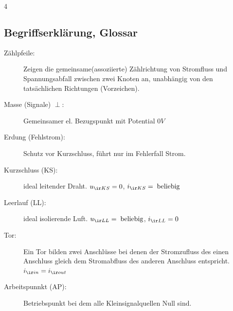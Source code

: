 \documentclass[fs, footer]{latex4ei}
\begin{document}
\begin{multicols*}{4}
{        \subsection{Begriffserklärung, Glossar}
        \begin{description}%
            \item[Zählpfeile:] Zeigen die gemeinsame(assoziierte) Zählrichtung von Stromfluss und Spannungsabfall zwischen zwei Knoten an, unabhängig von den tatsächlichen Richtungen (Vorzeichen).
            \item[Masse (Signale) $\perp$:] Gemeinsamer el. Bezugspunkt mit Potential $0V$
            \item[Erdung (Fehlstrom):] Schutz vor Kurzschluss, führt nur im Fehlerfall Strom.
            \item[Kurzschluss (KS):] ideal leitender Draht. $u_{\ir KS} = 0$, $i_{\ir KS}=\; \mathrm{beliebig}$
            \item[Leerlauf (LL):] ideal isolierende Luft. $u_{\ir LL}=\; \mathrm{beliebig}$, $i_{\ir LL} = 0$
            \item[Tor:] Ein Tor bilden zwei Anschlüsse bei denen der Stromzufluss des einen Anschluss gleich dem Stromabfluss des anderen Anschluss entspricht. $i_{\ir in} = i_{\ir out}$
            \item[Arbeitspunnkt (AP):] Betriebspunkt bei dem alle Kleinsignalquellen Null sind.
        \end{description}
    }

\end{multicols*}
\end{document}
